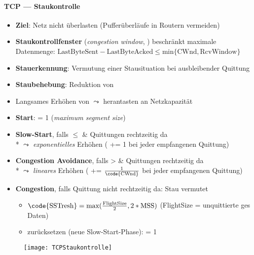 \paragraph{TCP --- Staukontrolle}
\begin{itemize}
	  \item \textbf{Ziel}: Netz nicht überlasten (Pufferüberläufe in Routern vermeiden)
	\item \textbf{Staukontrollfenster} (\emph{congestion window}, ) beschränkt maximale Datenmenge: \( \text{LastByteSent} - \text{LastByteAcked} \leq \text{min} \{ \text{CWnd}, \text{RcvWindow} \} \)
	\item \textbf{Stauerkennung}: Vermutung einer Stausituation bei ausbleibender Quittung
	\item \textbf{Staubehebung}: Reduktion von 
	\item Langsames Erhöhen von  \( \leadsto \) herantasten an Netzkapazität
  \item \textbf{Start}:  = 1  (\emph{maximum segment size})
  \item \textbf{Slow-Start}, falls  \( \leq \)  \& Quittungen rechtzeitig da \\* \( \leadsto \) \emph{exponentielles} Erhöhen  ( += 1 bei jeder empfangenen Quittung)
  \item \textbf{Congestion Avoidance}, falls  >  \& Quittungen rechtzeitig da \\* \( \leadsto \) \emph{lineares} Erhöhen  ( += \( \tfrac{1}{\text{\code{CWnd}}} \) bei jeder empfangenen Quittung)
  \item \textbf{Congestion}, falls Quittung nicht rechtzeitig da: Stau vermutet
  \begin{itemize}
    \item \( \text{\code{SSTresh}} = \text{max}(\tfrac{\text{FlightSize}}{2}, 2*\text{MSS}) \) (FlightSize = unquittierte ges Daten)
    \item {} zurücksetzen (neue Slow-Start-Phase):  = 1 
  \end{itemize}
\end{itemize}
\begin{figure}[H]\centering\label{TCPStaukontrolle}\texttt{[image: TCPStaukontrolle]}\end{figure}